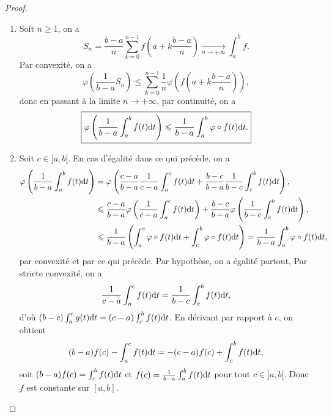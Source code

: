 \documentclass[12pt]{article}
\begin{document}
\begin{proof}
    \phantom{}
    \begin{enumerate}
        \item Soit $n\geqslant1$, on a 
        \begin{equation}
            S_n=\frac{b-a}{n}\sum_{k=0}^{n-1}f\left(a+k\frac{b-a}{n}\right)\xrightarrow[n\to+\infty]{}\int_{a}^{b}f.
        \end{equation}
        Par convexité, on a 
        \begin{equation}
            \varphi\left(\frac{1}{b-a}S_n\right)\leqslant\sum_{k=0}^{n-1}\frac{1}{n}\varphi\left(f\left(a+k\frac{b-a}{n}\right)\right),
        \end{equation}
        donc en passant à la limite $n\to+\infty$, par continuité, on a 
        \begin{equation}
            \boxed{
            \varphi\left(\frac{1}{b-a}\int_{a}^{b}f(t)\mathrm{d} t\right)\leqslant\frac{1}{b-a}\int_{a}^{b}\varphi\circ f(t)\mathrm{d} t.}
        \end{equation}

        \item Soit $c\in]a,b[$. En cas d'égalité dans ce qui précède, on a 
        \begin{align}
            \varphi\left(\frac{1}{b-a}\int_{a}^{b}f(t)\mathrm{d} t\right)
            &=\varphi\left(\frac{c-a}{b-a}\frac{1}{c-a}\int_{a}^{c}f(t)\mathrm{d} t+\frac{b-c}{b-a}\frac{1}{b-c}\int_{c}^{b}f(t)\mathrm{d} t\right),\\
            &\leqslant\frac{c-a}{b-a}\varphi\left(\frac{1}{c-a}\int_{a}^{c}f(t)\mathrm{d} t\right)+\frac{b-c}{b-a}\varphi\left(\frac{1}{b-c}\int_{c}^{b}f(t)\mathrm{d} t\right),\\
            &\leqslant\frac{1}{b-a}\left(\int_{a}^{c}\varphi\circ f(t)\mathrm{d} t+\int_{c}^{b}\varphi\circ f(t)\mathrm{d} t\right)=\frac{1}{b-a}\int_{a}^{b}\varphi\circ f(t)\mathrm{d} t,
        \end{align}
        par convexité et par ce qui précède. Par hypothèse, on a égalité partout, Par stricte convexité, on a 
        \begin{equation}
            \frac{1}{c-a}\int_{a}^{c}f(t)\mathrm{d} t=\frac{1}{b-c}\int_{c}^{b}f(t)\mathrm{d} t,
        \end{equation}
        d'où $(b-c)\int_{a}^{c}g(t)\mathrm{d} t=(c-a)\int_{c}^{b}f(t)\mathrm{d} t$. En dérivant par rapport à $c$, on obtient
        \begin{equation}
            (b-a)f(c)-\int_{a}^{c}f(t)\mathrm{d} t=-(c-a)f(c)+\int_{c}^{b}f(t)\mathrm{d} t,
        \end{equation}
        soit $(b-a)f(c)=\int_{c}^{b}f(t)\mathrm{d} t$ et $f(c)=\frac{1}{b-a}\int_{a}^{b}f(t)\mathrm{d} t$ pour tout $c\in]a,b[$. Donc $f$ est constante sur $[a,b]$.
    \end{enumerate}
\end{proof}
\end{document}
